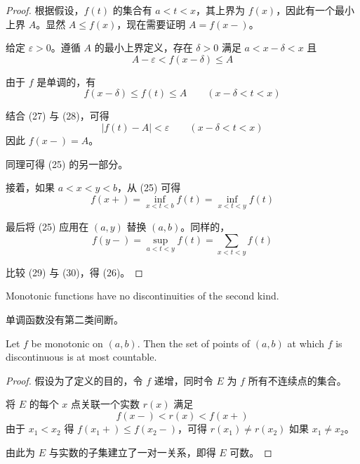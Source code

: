 \documentclass[../poma-notes.tex]{subfiles}
\begin{document}
\begin{proof}
  根据假设，$f(t)$ 的集合有 $a < t < x$，其上界为 $f(x)$，因此有一个最小上界 $A$。显然 $A \le f(x)$，现在需要证明 $A = f(x-)$。

  给定 $\varepsilon > 0$。遵循 $A$ 的最小上界定义，存在 $\delta > 0$ 满足 $a < x - \delta < x$ 且
  \begin{equation}
    A - \varepsilon < f(x - \delta) \le A
  \end{equation}

  由于 $f$ 是单调的，有
  \begin{equation}
    f(x - \delta) \le f(t) \le A \qquad (x - \delta < t < x)
  \end{equation}

  结合 (27) 与 (28)，可得
  \[
    |f(t) - A| < \varepsilon \qquad (x - \delta < t < x)
  \]
  因此 $f(x-) = A$。

  同理可得 (25) 的另一部分。

  接着，如果 $a < x < y < b$，从 (25) 可得
  \begin{equation}
    f(x+) = \inf_{x<t<b} f(t) = \inf_{x<t<y} f(t)
  \end{equation}

  最后将 (25) 应用在 $(a, y)$ 替换 $(a, b)$。同样的，
  \begin{equation}
    f(y-) = \sup_{a<t<y} f(t) = \sum_{x<t<y} f(t)
  \end{equation}

  比较 (29) 与 (30)，得 (26)。
\end{proof}

\begin{corollary}
  Monotonic functions have no discontinuities of the second kind.
\end{corollary}

\begin{anote}
  单调函数没有第二类间断。
\end{anote}

\begin{theorem}
  Let $f$ be monotonic on $(a, b)$. Then the set of points of $(a, b)$ at which $f$ is discontinuous is at most countable.
\end{theorem}

\begin{proof}
  假设为了定义的目的，令 $f$ 递增，同时令 $E$ 为 $f$ 所有不连续点的集合。

  将 $E$ 的每个 $x$ 点关联一个实数 $r(x)$ 满足
  \[
    f(x-) < r(x) < f(x+)
  \]
  由于 $x_1 < x_2$ 得 $f(x_1+) \le f(x_2-)$，可得 $r(x_1) \ne r(x_2)$ 如果 $x_1 \ne x_2$。

  由此为 $E$ 与实数的子集建立了一对一关系，即得 $E$ 可数。
\end{proof}
\end{document}
